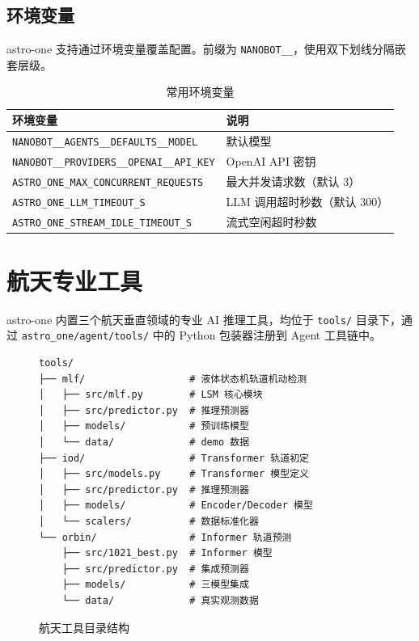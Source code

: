 \documentclass[12pt,a4paper,UTF8]{ctexart}
\begin{document}
\section{环境变量}

astro-one 支持通过环境变量覆盖配置。前缀为 \texttt{NANOBOT\_\_}，使用双下划线分隔嵌套层级。

\begin{table}[H]
\centering
\begin{tabular}{L{7cm} L{8cm}}
\toprule
\textbf{环境变量} & \textbf{说明} \\
\midrule
\texttt{NANOBOT\_\_AGENTS\_\_DEFAULTS\_\_MODEL} & 默认模型 \\
\texttt{NANOBOT\_\_PROVIDERS\_\_OPENAI\_\_API\_KEY} & OpenAI API 密钥 \\
\texttt{ASTRO\_ONE\_MAX\_CONCURRENT\_REQUESTS} & 最大并发请求数（默认 3） \\
\texttt{ASTRO\_ONE\_LLM\_TIMEOUT\_S} & LLM 调用超时秒数（默认 300） \\
\texttt{ASTRO\_ONE\_STREAM\_IDLE\_TIMEOUT\_S} & 流式空闲超时秒数 \\
\bottomrule
\end{tabular}
\caption{常用环境变量}
\end{table}

\chapter{航天专业工具}

astro-one 内置三个航天垂直领域的专业 AI 推理工具，均位于 \texttt{tools/} 目录下，通过 \texttt{astro\_one/agent/tools/} 中的 Python 包装器注册到 Agent 工具链中。

\begin{figure}[H]
\centering
\begin{minipage}{0.95\textwidth}
\begin{verbatim}
tools/
├── mlf/                  # 液体状态机轨道机动检测
│   ├── src/mlf.py        # LSM 核心模块
│   ├── src/predictor.py  # 推理预测器
│   ├── models/           # 预训练模型
│   └── data/             # demo 数据
├── iod/                  # Transformer 轨道初定
│   ├── src/models.py     # Transformer 模型定义
│   ├── src/predictor.py  # 推理预测器
│   ├── models/           # Encoder/Decoder 模型
│   └── scalers/          # 数据标准化器
└── orbin/                # Informer 轨道预测
    ├── src/1021_best.py  # Informer 模型
    ├── src/predictor.py  # 集成预测器
    ├── models/           # 三模型集成
    └── data/             # 真实观测数据
\end{verbatim}
\end{minipage}
\caption{航天工具目录结构}
\end{figure}
\end{document}
